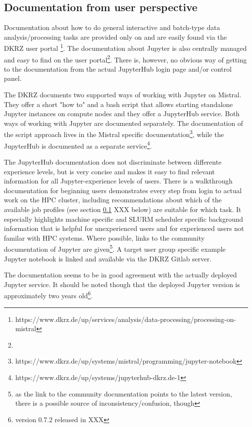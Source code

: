 \subsection{Documentation from user perspective}

Documentation about how to do general interactive and batch-type data analysis/processing tasks are provided only on and are easily found via the DKRZ user portal \footnote{https://www.dkrz.de/up/services/analysis/data-processing/processing-on-mistral}.
The documentation about Jupyter is also centrally managed and easy to find on the user portal\footnote{}.
There is, however, no obvious way of getting to the documentation from the actual JupyterHub login page and/or control panel.

The DKRZ documents two supported ways of working with Jupyter on Mistral.
They offer a short "how to" and a bash script that allows starting standalone Jupyter instances on compute nodes and they offer a JupyterHub service.
Both ways of working with Jupyter are documented separately.
The documentation of the script approach lives in the Mistral specific documentation\footnote{https://www.dkrz.de/up/systems/mistral/programming/jupyter-notebook}, while the JupyterHub is documented as a separate service\footnote{https://www.dkrz.de/up/systems/jupyterhub-dkrz.de-1}.

The JupyterHub documentation does not discriminate between differente experience levels, but is very concise and makes it easy to find relevant information for all Jupyter-experience levels of users.
There is a walkthrough documentation for beginning users demonstrates every step from login to actual work on the HPC cluster, including recommendations about which of the available job profiles (see section \ref{} XXX below) are suitable for which task.
It especially highlights machine specific and SLURM scheduler specific background information that is helpful for unexperienced users and for experienced users not familar with HPC systems.
Where possible, links to the community documentation of Jupyter are given\footnote{as the link to the community documentation points to the latest version, there is a possible source of inconsistency/confusion, though}.
A target user group specific example Jupyter notebook is linked and available via the DKRZ Gitlab server.

The documentation seems to be in good agreement with the actually deployed Jupyter service.
It should be noted though that the deployed Jupyter version is approximately two years old\footnote{version 0.7.2 released in XXX}.

